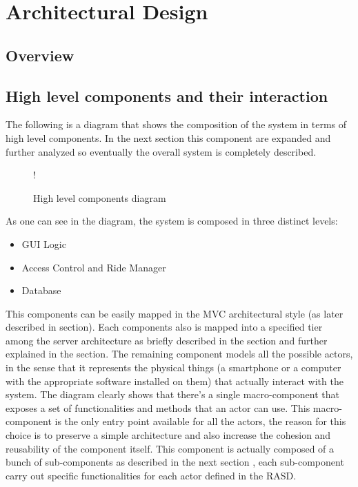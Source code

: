 \section{Architectural Design}
\subsection{Overview}
\label{sec:overview}
\subsection{High level components and their interaction}
\label{sec:high-level}
The following is a diagram that shows the composition of the system in terms of high level components. \newline
In the next section this component are expanded and further analyzed so eventually the overall system is completely described.
\begin{figure}[H]
	\centering
	\resizebox{6in}
	{!}{}
	\caption{High level components diagram}
\end{figure}
As one can see in the diagram, the system is composed in three distinct levels:
\begin{itemize}
	\item GUI Logic
	\item Access Control and Ride Manager
	\item Database
\end{itemize}
This components can be easily mapped in the MVC architectural style (as later described in  section).
Each components also is mapped into a specified tier among the server architecture as briefly described in the  section and further explained in the  section.
The remaining component models all the possible actors, in the sense that it represents the physical things (a smartphone or a computer with the appropriate software installed on them) that actually interact with the system. \newline
The diagram clearly shows that there's a single macro-component that exposes a set of functionalities and methods that an actor can use. This macro-component is the only entry point available for all the actors, the reason for this choice is to preserve a simple architecture and also increase the cohesion and reusability of the component itself. \newline
This component is actually composed of a bunch of sub-components as described in the next section , each sub-component carry out specific functionalities for each actor defined in the RASD.
